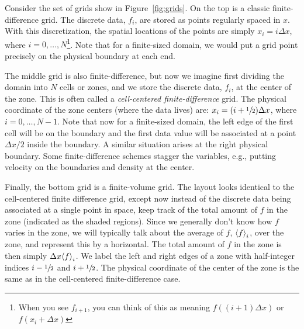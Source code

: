 Consider the set of grids show in Figure~\ref{fig:grids}.  On the top
is a classic finite-difference grid.  The discrete data, $f_i$, are
stored as points regularly spaced in $x$.  With this discretization,
the spatial locations of the points are simply $x_i = i \Delta x$,
where $i = 0, \ldots, N$\footnote{When you see $f_{i+1}$, you can
  think of this as meaning $f((i+1)\Delta x)$ or $f(x_i + \Delta x)$}.
Note that for a finite-sized domain, we would put a grid point
precisely on the physical boundary at each end.

The middle grid is also finite-difference, but now we imagine first
dividing the domain into $N$ cells or zones, and we store the discrete
data, $f_i$, at the center of the zone.  This is often called a {\em
  cell-centered finite-difference} grid.  The physical coordinate of
the zone centers (where the data lives) are: $x_i = (i + {\sfrac{1}{2}})\Delta
x$, where $i = 0, \ldots, N-1$.  Note that now for a finite-sized
domain, the left edge of the first cell will be on the boundary and
the first data value will be associated at a point $\Delta x/2$ inside
the boundary.  A similar situation arises at the right physical
boundary.  Some finite-difference schemes stagger the variables,
e.g., putting velocity on the boundaries and density at the center.

Finally, the bottom grid is a finite-volume grid.  The layout looks
identical to the cell-centered finite difference grid, except now
instead of the discrete data being associated at a single point in
space, keep track of the total amount of $f$ in the zone (indicated as the shaded regions).  Since we generally don't know how $f$ varies in the zone,
we will typically talk about the average of $f$, ${\langle f\rangle}_i$, over
the zone, and represent this by a horizontal.  The total amount of $f$ in
the zone is then simply $\Delta x {\langle f\rangle}_i$. 
We label the left and right edges of a zone with half-integer indices
$i-{\sfrac{1}{2}}$ and $i+{\sfrac{1}{2}}$.  The physical coordinate of the center of the zone
is the same as in the cell-centered finite-difference case.


